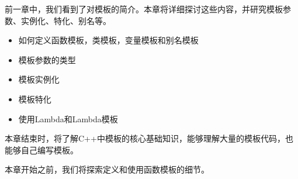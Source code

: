 前一章中，我们看到了对模板的简介。本章将详细探讨这些内容，并研究模板参数、实例化、特化、别名等。

\begin{itemize}
\item
如何定义函数模板，类模板，变量模板和别名模板

\item
模板参数的类型

\item
模板实例化

\item
模板特化

\item
使用Lambda和Lambda模板
\end{itemize}

本章结束时，将了解C++中模板的核心基础知识，能够理解大量的模板代码，也能够自己编写模板。

本章开始之前，我们将探索定义和使用函数模板的细节。












